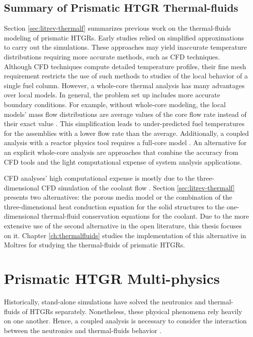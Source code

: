 \subsection{Summary of Prismatic HTGR Thermal-fluids}

Section \ref{sec:litrev-thermalf} summarizes previous work on the thermal-fluids modeling of prismatic HTGRs.
Early studies relied on simplified approximations to carry out the simulations.
These approaches may yield inaccurate temperature distributions requiring more accurate methods, such as CFD techniques.
Although CFD techniques compute detailed temperature profiles, their fine mesh requirement restricts the use of such methods to studies of the local behavior of a single fuel column.
However, a whole-core thermal analysis has many advantages over local models.
In general, the problem set up includes more accurate boundary conditions.
For example, without whole-core modeling, the local models' mass flow distributions are average values of the core flow rate instead of their exact value \cite{huning_novel_2016}.
This simplification leads to under-predicted fuel temperatures for the assemblies with a lower flow rate than the average.
Additionally, a coupled analysis with a reactor physics tool requires a full-core model \cite{tak_practical_2012}.
An alternative for an explicit whole-core analysis are approaches that combine the accuracy from CFD tools and the light computational expense of system analysis applications.

CFD analyses' high computational expense is mostly due to the three-dimensional CFD simulation of the coolant flow \cite{travis_thermalhydraulics_2013}.
Section \ref{sec:litrev-thermalf} presents two alternatives: the porous media model or the combination of the three-dimensional heat conduction equation for the solid structures to the one-dimensional thermal-fluid conservation equations for the coolant.
Due to the more extensive use of the second alternative in the open literature, this thesis focuses on it.
Chapter \ref{ch:thermalfluids} studies the implementation of this alternative in Moltres for studying the thermal-fluids of prismatic HTGRs.

\section{Prismatic HTGR Multi-physics}
\label{sec:litreview-multi}

Historically, stand-alone simulations have solved the neutronics and thermal-fluids of HTGRs separately.
Nonetheless, these physical phenomena rely heavily on one another.
Hence, a coupled analysis is necessary to consider the interaction between the neutronics and thermal-fluids behavior \cite{tak_cappgamma_2016}.

